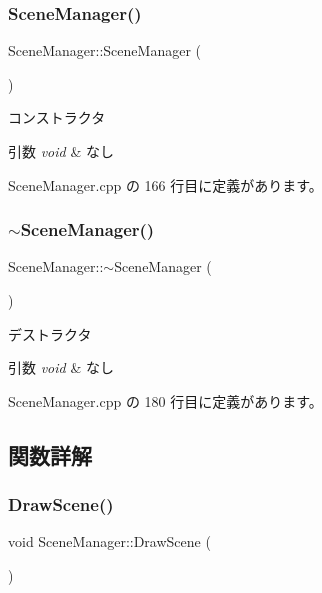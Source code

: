 \subsubsection{\texorpdfstring{Scene\+Manager()}{SceneManager()}}
{\footnotesize\ttfamily Scene\+Manager\+::\+Scene\+Manager (\begin{DoxyParamCaption}{ }\end{DoxyParamCaption})}



コンストラクタ 


\begin{DoxyParams}{引数}
{\em void} & なし \\
\hline
\end{DoxyParams}


 Scene\+Manager.\+cpp の 166 行目に定義があります。

\mbox{\label{class_scene_manager_a2bb376a85d29e85f47753e26c7539229}} 
\subsubsection{\texorpdfstring{$\sim$\+Scene\+Manager()}{~SceneManager()}}
{\footnotesize\ttfamily Scene\+Manager\+::$\sim$\+Scene\+Manager (\begin{DoxyParamCaption}{ }\end{DoxyParamCaption})}



デストラクタ 


\begin{DoxyParams}{引数}
{\em void} & なし \\
\hline
\end{DoxyParams}


 Scene\+Manager.\+cpp の 180 行目に定義があります。



\subsection{関数詳解}
\mbox{\label{class_scene_manager_a828b35826f757b8af34aa767c6b40378}} 
\subsubsection{\texorpdfstring{Draw\+Scene()}{DrawScene()}}
{\footnotesize\ttfamily void Scene\+Manager\+::\+Draw\+Scene (\begin{DoxyParamCaption}{ }\end{DoxyParamCaption})}



